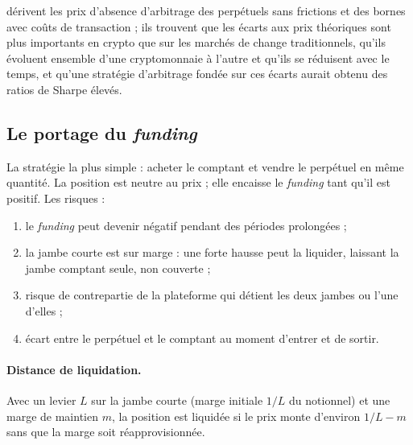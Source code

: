 \citet{he2022perp} dérivent les prix d'absence d'arbitrage des perpétuels sans frictions et des bornes avec coûts de transaction ; ils trouvent que les écarts aux prix théoriques sont plus importants en crypto que sur les marchés de change traditionnels, qu'ils évoluent ensemble d'une cryptomonnaie à l'autre et qu'ils se réduisent avec le temps, et qu'une stratégie d'arbitrage fondée sur ces écarts aurait obtenu des ratios de Sharpe élevés.

\subsection{Le portage du \emph{funding}}

La stratégie la plus simple : acheter le comptant et vendre le perpétuel en même quantité. La position est neutre au prix ; elle encaisse le \emph{funding} tant qu'il est positif. Les risques :
\begin{enumerate}
\item le \emph{funding} peut devenir négatif pendant des périodes prolongées ;
\item la jambe courte est sur marge : une forte hausse peut la liquider, laissant la jambe comptant seule, non couverte ;
\item risque de contrepartie de la plateforme qui détient les deux jambes ou l'une d'elles ;
\item écart entre le perpétuel et le comptant au moment d'entrer et de sortir.
\end{enumerate}

\paragraph{Distance de liquidation.} Avec un levier $L$ sur la jambe courte (marge initiale $1/L$ du notionnel) et une marge de maintien $m$, la position est liquidée si le prix monte d'environ $1/L - m$ sans que la marge soit réapprovisionnée.

